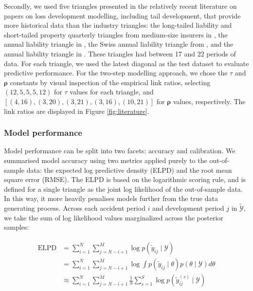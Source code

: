Secondly, we used five
triangles presented in the
relatively recent literature on papers on loss development
modelling,
including tail development, that provide more
historical data than the industry triangles:
the long-tailed liability and short-tailed property 
quarterly triangles from medium-size insurers
in \cite{balona2022}, the annual liability triangle in \cite{merz2015},
the Swiss annual liability triangle from \cite{gisler2009},
and the annual liability triangle in \cite{verrall2012}.
These triangles had between 17 and 22 periods of
data. For each triangle, we used the latest diagonal as the
test dataset to evaluate predictive performance.
For the two-step modelling approach, we chose the
$\tau$ and $\bm{\rho}$ constants
by visual inspection of the empirical link ratios,
selecting $(12, 5, 5, 5, 12)$ for $\tau$ values
for each triangle,
and $[(4, 16), (3, 20), (3, 21), (3, 16), (10, 21)]$
for $\bm{\rho}$ values, respectively.
The link ratios are displayed in Figure \ref{fig:literature}.

\subsubsection{Model performance}
Model performance can be split into two facets:
accuracy and calibration.
We summarised model accuracy using two metrics
applied purely to the out-of-sample data: the expected
log predictive density (ELPD) and the root mean
square error (RMSE). 
The ELPD \citep{vehtari2017} is based on the logarithmic scoring
rule, and is defined for a single triangle
as the joint log likelihood of the out-of-sample
data. In this way, it more heavily
penalises models further from
the true data generating process.
Across each accident period $i$ and development
period $j$ in $\mathcal{\tilde{Y}}$, we take the
sum of log likelihood values marginalized across the posterior
samples:

\begin{align}
	\label{eq:elpd}
	\begin{split}
	\mathrm{ELPD} &= \sum_{i=1}^{N} \sum_{j=N - i + 1}^{M} 
					\log p(\tilde{y}_{ij} \mid \mathcal{Y})\\
				 &=	\sum_{i=1}^{N} \sum_{j=N - i + 1}^{M} 
					\log \int p(\tilde{y}_{ij} \mid \theta)
					p(\theta \mid \mathcal{Y})
					d \theta \\
				 &\approx \sum_{i=1}^{N} \sum_{j=N - i + 1}^{M} 
					\frac{1}{S} \sum_{s=1}^{S} 
					\log p(\tilde{y}_{ij}^{(s)} \mid \mathcal{Y})
	\end{split}
\end{align}


